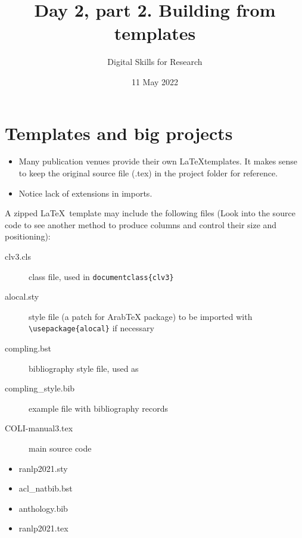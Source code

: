 \documentclass[a4paper,11pt]{article}
\title{Day 2, part 2. Building from templates}
\author{Digital Skills for Research}
\date{11 May 2022}
\newcounter{example}
\begin{document}
	
	\maketitle
	\tableofcontents


\section{Templates and big projects}
\begin{itemize}
	\item Many publication venues provide their own \LaTeX templates. It makes sense to keep the original source file (.tex) in the project folder for reference. 
	\item Notice lack of extensions in imports.
\end{itemize}

A zipped \LaTeX~template may include the following files (Look into the source code to see another method to produce columns and control their size and positioning):

\medskip

\begin{minipage}[c]{0.65\linewidth}
	\begin{tcolorbox}[title={Computational Linguistics by MIT Press Journals}]
		\begin{description}
			\item[clv3.cls] class file, used in \verb|documentclass{clv3}|
			\item[alocal.sty] style file (a patch for ArabTeX package) to be imported with \verb|\usepackage{alocal}| if necessary
			\item[compling.bst] bibliography style file, used as \verb||
			\item[compling\_style.bib] example file with bibliography records 
			\item[COLI-manual3.tex] main source code 
		\end{description}
	\end{tcolorbox}
\end{minipage} 
\hfill  %
\begin{minipage}[c]{0.3\linewidth}
	\begin{tcolorbox}[title={RANLP conference}]
		\begin{itemize}
			\item ranlp2021.sty
			\item acl\_natbib.bst
			\item anthology.bib
			\item ranlp2021.tex
		\end{itemize}
	\end{tcolorbox}
\end{minipage}
\end{document}
